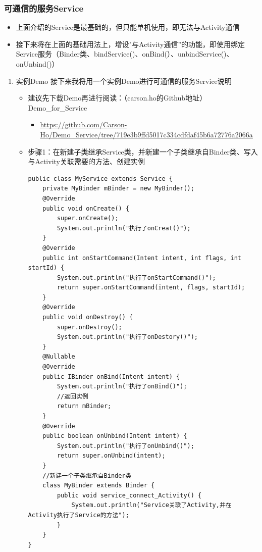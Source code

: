 \documentclass[9pt, b5paper]{article}
\begin{document}
\subsubsection{可通信的服务Service}
\label{sec-3-4-2}
\begin{itemize}
\item 上面介绍的Service是最基础的，但只能单机使用，即无法与Activity通信
\item 接下来将在上面的基础用法上，增设"与Activity通信”的功能，即使用绑定Service服务（Binder类、bindService()、onBind(）、unbindService()、onUnbind()）
\end{itemize}
\begin{enumerate}
\item 实例Demo
\label{sec-3-4-2-1}
接下来我将用一个实例Demo进行可通信的服务Service说明
\begin{itemize}
\item 建议先下载Demo再进行阅读：（carson.ho的Github地址）Demo\_for\_Service
\begin{itemize}
\item \url{https://github.com/Carson-Ho/Demo_Service/tree/719e3b9ffd5017c334cdfdaf45b6a72776a2066a}
\end{itemize}
\item 步骤1：在新建子类继承Service类，并新建一个子类继承自Binder类、写入与Activity关联需要的方法、创建实例
\begin{verbatim}
public class MyService extends Service {
    private MyBinder mBinder = new MyBinder();
    @Override
    public void onCreate() {
        super.onCreate();
        System.out.println("执行了onCreat()");
    }
    @Override
    public int onStartCommand(Intent intent, int flags, int startId) {
        System.out.println("执行了onStartCommand()");
        return super.onStartCommand(intent, flags, startId);
    }
    @Override
    public void onDestroy() {
        super.onDestroy();
        System.out.println("执行了onDestory()");
    }
    @Nullable
    @Override
    public IBinder onBind(Intent intent) {
        System.out.println("执行了onBind()");
        //返回实例
        return mBinder;
    }
    @Override
    public boolean onUnbind(Intent intent) {
        System.out.println("执行了onUnbind()");
        return super.onUnbind(intent);
    }
    //新建一个子类继承自Binder类
    class MyBinder extends Binder {
        public void service_connect_Activity() {
            System.out.println("Service关联了Activity,并在Activity执行了Service的方法");
        }
    }
}
\end{verbatim}

\end{itemize}
\end{enumerate}
\end{document}
